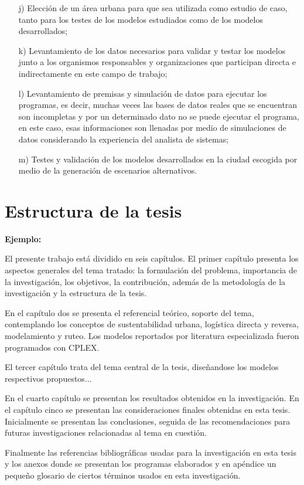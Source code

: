 \begin{enumerate}
\item[j)]	Elección de un área urbana para que sea utilizada como estudio de caso,  tanto para los testes de los modelos estudiados como de los modelos desarrollados;
\item[k)]	Levantamiento de los datos necesarios para validar y testar los modelos junto a los organismos responsables y organizaciones que participan directa e indirectamente en este campo de trabajo;
\item[l)]	Levantamiento de premisas y simulación de datos para ejecutar los programas, es decir, muchas veces las bases de datos reales que se encuentran son incompletas y por un determinado dato no se puede ejecutar el programa, en este caso, esas informaciones son llenadas por medio de simulaciones de datos considerando la experiencia del analista de sistemas;
\item[m)]	Testes y validación de los modelos desarrollados en la ciudad escogida por medio de la generación de escenarios alternativos.    
\end{enumerate}


\section{Estructura de la tesis}

{\bf Ejemplo:}\par
\vskip 0.1cm
El presente trabajo está dividido en seis capítulos. El primer capítulo presenta los aspectos generales del tema tratado: la formulación del problema, importancia de la investigación, los objetivos, la contribución, además de la metodología de la investigación y la estructura de la tesis.

En el capítulo dos se presenta el referencial teórico, soporte del tema, contemplando los conceptos de sustentabilidad urbana, logística directa y reversa, modelamiento y ruteo. Los modelos reportados por literatura especializada fueron programados con CPLEX.

El tercer capítulo trata del tema central de la tesis, diseñandose los modelos respectivos propuestos...   

 En el cuarto capítulo se presentan los resultados obtenidos en la investigación. En el capítulo cinco se presentan las consideraciones finales obtenidas en esta tesis. Inicialmente se presentan las conclusiones, seguida de las recomendaciones para futuras investigaciones relacionadas al tema en cuestión.

Finalmente las referencias bibliográficas usadas para la investigación en esta tesis y los anexos donde se presentan los programas elaborados y en apéndice un pequeño glosario de ciertos términos usados en esta investigación.


